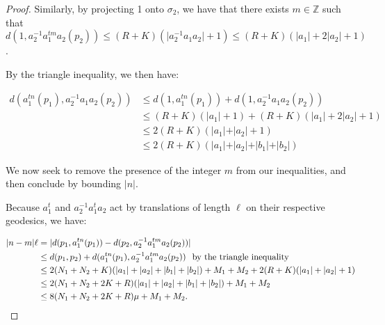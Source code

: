 \documentclass[12pt]{article}
\newcommand{\vs}{\vskip10pt}
\begin{document}
\begin{proof}
		
		
		\vs 
		
		Similarly, by projecting 1 onto $\sigma_2$, we have that there exists $m \in \mathbb{Z}$ such that $d(1, a_2^{-1} a_1^{tm} a_2 (p_2)) \leq (R + K) (\vert a_2^{-1} a_1 a_2 \vert + 1) \leq (R+K) (\vert a_1 \vert + 2 \vert a_2 \vert + 1)$.
		
		\vs 
		
		By the triangle inequality, we then have: 
		
		\begin{align*}
		d(a_1^{tn}(p_1), a_2^{-1}a_1 a_2 (p_2)) &\leq d(1, a_1^{tn}(p_1)) + d(1, a_2^{-1}a_1 a_2 (p_2)) \\
		&\leq (R + K) (\vert a_1 \vert + 1) + (R+K) (\vert a_1 \vert + 2 \vert a_2 \vert + 1) \\
		&\leq 2(R+K)(\vert a_1 \vert + \vert a_2 \vert + 1) \\
		&\leq 2(R+K)(\vert a_1 \vert + \vert a_2 \vert + \vert b_1 \vert + \vert b_2 \vert) 
		\end{align*}
		
		
		\vs
		
		We now seek to remove the presence of the integer $m$ from our inequalities, and then conclude by bounding $\vert n \vert$. 
		
		\vs 
		
		Because $a_1^t$ and $a_2^{-1} a_1^t a_2$ act by translations of length $\ell$ on their respective geodesics, we have:
		
		\begin{align*}
		\vert n - m \vert \ell &= \vert d(p_1, a_1^{tn}(p_1)) - d(p_2, a_2^{-1} a_1^{tm} a_2 (p_2)) \vert \\
		&\leq d(p_1, p_2) + d(a_1^{tn}(p_1), a_2^{-1} a_1^{tm} a_2 (p_2)) \hspace{0.25cm} \text{by the triangle inequality} \\
		&\leq 2(N_1 + N_2 + K) (\vert a_1 \vert + \vert a_2 \vert + \vert b_1 \vert + \vert b_2 \vert) + M_1 + M_2 + 2(R+K)(\vert a_1 \vert + \vert a_2 \vert + 1) \\
		&\leq 2(N_1 + N_2 + 2K + R) (\vert a_1 \vert + \vert a_2 \vert + \vert b_1 \vert + \vert b_2 \vert) + M_1 + M_2 \\
		&\leq 8(N_1 + N_2 + 2K + R)\mu + M_1 + M_2. 
		\end{align*}
		

\end{proof}
\end{document}
